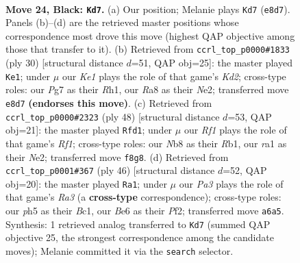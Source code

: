 \documentclass[11pt]{article}
\begin{document}
\clearpage

\begin{figure}[p]\centering
\begin{subfigure}{0.46\textwidth}\centering
\resizebox{\linewidth}{!}{%
\newchessgame
\chessboard[
  setfen={rn2kr2/1p2b1pp/p3b3/3pPp1P/8/P5P1/4NK2/RNB2R2 b - - 1 24},
  showmover=false,
  pgfstyle=straightmove, color=movearrow, markmove={e8-d7}
]}
\caption{}
\end{subfigure}\hfill
\begin{subfigure}{0.46\textwidth}\centering
\resizebox{\linewidth}{!}{%
\newchessgame
\chessboard[
  setfen={r3k2r/pp1b1ppp/1n2p3/n7/3P4/P2BPP2/1B1KN1PP/1R5R w kq - 7 16},
  showmover=false,
  pgfstyle=straightmove, color=movearrow, markmove={d2-e1}
]}
\caption{}
\end{subfigure}
\\[4pt]
\begin{subfigure}{0.46\textwidth}\centering
\resizebox{\linewidth}{!}{%
\newchessgame
\chessboard[
  setfen={r3r1k1/4npb1/pp4pp/3p4/P2P4/4B2P/1P2NPP1/1R3RK1 w - - 1 25},
  showmover=false,
  pgfstyle=straightmove, color=movearrow, markmove={f1-d1}
]}
\caption{}
\end{subfigure}\hfill
\begin{subfigure}{0.46\textwidth}\centering
\resizebox{\linewidth}{!}{%
\newchessgame
\chessboard[
  setfen={1rb4r/2p1k1pp/p1n2p2/8/P2pP3/R2B4/5PPP/2BR2K1 w - - 2 24},
  showmover=false,
  pgfstyle=straightmove, color=movearrow, markmove={a3-a1}
]}
\caption{}
\end{subfigure}
\caption{\textbf{Move 24, Black: \texttt{Kd7}.} (a) Our position; Melanie plays \texttt{Kd7} (\texttt{e8d7}). Panels (b)--(d) are the retrieved master positions whose correspondence most drove this move (highest QAP objective among those that transfer to it). (b) Retrieved from \texttt{ccrl\_top\_p0000\#1833} (ply 30) [structural distance $d$=51, QAP obj=25]: the master played \texttt{Ke1}; under $\mu$ our \emph{Ke1} plays the role of that game's \emph{Kd2}; cross-type roles: our \emph{P}g7 as their \emph{R}h1, our \emph{R}a8 as their \emph{N}e2; transferred move \texttt{e8d7} \textbf{(endorses this move)}. (c) Retrieved from \texttt{ccrl\_top\_p0000\#2323} (ply 48) [structural distance $d$=53, QAP obj=21]: the master played \texttt{Rfd1}; under $\mu$ our \emph{Rf1} plays the role of that game's \emph{Rf1}; cross-type roles: our \emph{N}b8 as their \emph{R}b1, our \emph{r}a1 as their \emph{N}e2; transferred move \texttt{f8g8}. (d) Retrieved from \texttt{ccrl\_top\_p0001\#367} (ply 46) [structural distance $d$=52, QAP obj=20]: the master played \texttt{Ra1}; under $\mu$ our \emph{Pa3} plays the role of that game's \emph{Ra3} (a \textbf{cross-type} correspondence); cross-type roles: our \emph{p}h5 as their \emph{B}c1, our \emph{B}e6 as their \emph{P}f2; transferred move \texttt{a6a5}. Synthesis: 1 retrieved analog transferred to \texttt{Kd7} (summed QAP objective 25, the strongest correspondence among the candidate moves); Melanie committed it via the \texttt{search} selector.}
\label{fig:thought-m47}
\end{figure}
\end{document}
